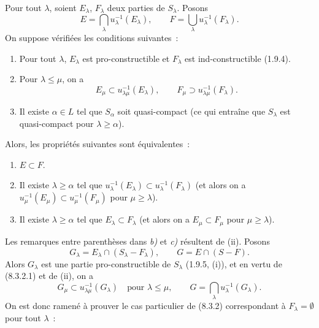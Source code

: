 \begin{theorem}[8.3.2]
\label{IV.8.3.2-fr}
Pour tout $\lambda$, soient $E_\lambda$, $F_\lambda$ deux parties de
$S_\lambda$. Posons
\begin{equation}
E=\bigcap_\lambda u_\lambda^{-1}(E_\lambda),\qquad
F=\bigcup_\lambda u_\lambda^{-1}(F_\lambda).
\tag{8.3.2.1}\label{IV.8.3.2.1-fr}
\end{equation}
On suppose vérifiées les conditions suivantes~:
\begin{enumerate}
\item[(i)] Pour tout $\lambda$, $E_\lambda$ est pro-constructible et
$F_\lambda$ est ind-constructible (1.9.4).
\item[(ii)] Pour $\lambda\leq\mu$, on a
\[
E_\mu\subset u_{\lambda\mu}^{-1}(E_\lambda),\qquad
F_\mu\supset u_{\lambda\mu}^{-1}(F_\lambda).
\]
\item[(iii)] Il existe $\alpha\in L$ tel que $S_\alpha$ soit quasi-compact
(ce qui entraîne que $S_\lambda$ est quasi-compact pour
$\lambda\geq\alpha$).
\end{enumerate}
Alors, les propriétés suivantes sont équivalentes~:
\begin{enumerate}
\item[\emph{a)}] $E\subset F$.
\item[\emph{b)}] Il existe $\lambda\geq\alpha$ tel que
$u_\lambda^{-1}(E_\lambda)\subset u_\lambda^{-1}(F_\lambda)$ (et alors on a
$u_\mu^{-1}(E_\mu)\subset u_\mu^{-1}(F_\mu)$ pour $\mu\geq\lambda$).
\item[\emph{c)}] Il existe $\lambda\geq\alpha$ tel que
$E_\lambda\subset F_\lambda$ (et alors on a $E_\mu\subset F_\mu$ pour
$\mu\geq\lambda$).
\end{enumerate}
\end{theorem}

Les remarques entre parenthèses dans \emph{b)} et \emph{c)} résultent de (ii).
Posons
\[
G_\lambda=E_\lambda\cap(S_\lambda-F_\lambda),\qquad
G=E\cap(S-F).
\]
Alors $G_\lambda$ est une partie pro-constructible de $S_\lambda$ (1.9.5,
(i)), et en vertu de (8.3.2.1) et de (ii), on a
\[
G_\mu\subset u_{\lambda\mu}^{-1}(G_\lambda)
\quad\text{pour }\lambda\leq\mu,
\qquad
G=\bigcap_\lambda u_\lambda^{-1}(G_\lambda).
\]
On est donc ramené à prouver le cas particulier de (8.3.2) correspondant à
$F_\lambda=\emptyset$ pour tout $\lambda$~:

